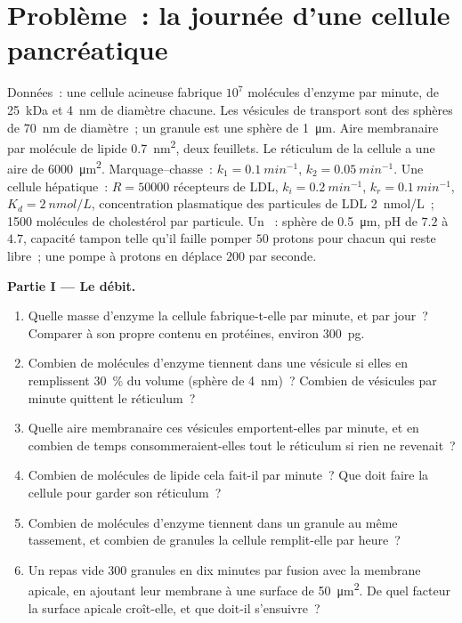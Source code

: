 \section{Problème~: la journée d'une cellule pancréatique}

\begin{problem}
\label{pb:b3:membrane-traffic:1}
Données~: une cellule acineuse fabrique $10^{7}$ molécules d'enzyme par
minute, de \qty{25}{kDa} et \qty{4}{nm} de diamètre chacune. Les
vésicules de transport sont des sphères de \qty{70}{nm} de diamètre~;
un granule est une sphère de \qty{1}{\micro m}. Aire membranaire par
molécule de lipide \qty{0.7}{nm^2}, deux feuillets. Le réticulum de la
cellule a une aire de \qty{6000}{\micro m^2}. Marquage--chasse~:
$k_{1} = \qty{0.1}{min^{-1}}$, $k_{2} = \qty{0.05}{min^{-1}}$. Une
cellule hépatique~: $R = \num{50000}$ récepteurs de LDL,
$k_{i} = \qty{0.2}{min^{-1}}$, $k_{r} = \qty{0.1}{min^{-1}}$,
$K_{d} = \qty{2}{nmol/L}$, concentration plasmatique des particules de
LDL \qty{2}{nmol/L}~; \num{1500} molécules de cholestérol par particule.
Un ~: sphère de \qty{0.5}{\micro m}, pH de $7.2$ à $4.7$,
capacité tampon telle qu'il faille pomper $50$ protons pour chacun qui
reste libre~; une pompe à protons en déplace $200$ par seconde.

\medskip
\noindent\textbf{Partie I --- Le débit.}
\begin{enumerate}
  \item Quelle masse d'enzyme la cellule fabrique-t-elle par minute, et
        par jour~? Comparer à son propre contenu en protéines, environ
        \qty{300}{pg}.
  \item Combien de molécules d'enzyme tiennent dans une vésicule si
        elles en remplissent \qty{30}{\%} du volume (sphère de
        \qty{4}{nm})~? Combien de vésicules par minute quittent le
        réticulum~?
  \item Quelle aire membranaire ces vésicules emportent-elles par
        minute, et en combien de temps consommeraient-elles tout le
        réticulum si rien ne revenait~?
  \item Combien de molécules de lipide cela fait-il par minute~? Que
        doit faire la cellule pour garder son réticulum~?
  \item Combien de molécules d'enzyme tiennent dans un granule au même
        tassement, et combien de granules la cellule remplit-elle par
        heure~?
  \item Un repas vide $300$ granules en dix minutes par fusion avec la
        membrane apicale, en ajoutant leur membrane à une surface de
        \qty{50}{\micro m^2}. De quel facteur la surface apicale
        croît-elle, et que doit-il s'ensuivre~?
\end{enumerate}


\end{problem}
